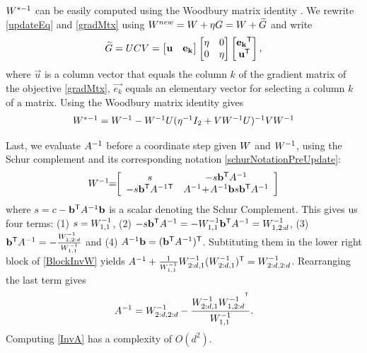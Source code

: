 \documentclass{article}
\begin{document}
${W}^{*-1}$ can be easily computed using the Woodbury matrix
identity \cite{woodbury1950inverting}. We rewrite  \eqref{updateEq} and \eqref{gradMtx} using ${{W^{new}}} = {W} + \eta G = {W}+{\widetilde{G}}$
and write
\begin{equation}
  {\widetilde{G}} = {U}{C}{V} = \left[ \begin{matrix}
      \mathbf{u} & \mathbf{e_k} \end{matrix} \right] \left[ \begin{matrix}
      \eta & 0 \\ 0 & \eta \end{matrix} \right] \left[ \begin{matrix}
      \mathbf{e_k}{}^\mathsf{T} \\ \mathbf{u}{}^\mathsf{T} \end{matrix} \right],
  \label{gradMtxWDB}
\end{equation}
where $\vec{u}$ is a column vector that equals the column $k$ of the gradient matrix of the objective \eqref{gradMtx},
$\vec{e_k}$ equals an elementary vector for selecting a column $k$ of
a matrix. 
Using the Woodbury matrix identity gives 
\begin{equation}
    \begin{array}{lcl}
    {W}^{*-1} = 
    {W}^{-1} - {W}^{-1} {U} (\eta^{-1} I_2 + {V}     {W}^{-1} {U})^{-1} {V} {W}^{-1}
    \end{array}
    \label{InvWwdb}
\end{equation}

Last, we evaluate $A^{-1}$ before a coordinate step given ${W}$
and ${W}^{-1}$, using the Schur complement and its corresponding
notation \eqref{schurNotationPreUpdate}:
\begin{equation}
\begin{array}{l}
 {W}^{-1} \!\!=\!\! 
 \left[ \begin{array}{cc} s & -s \mathbf{b}{}^\mathsf{T} A^{-1} \\ -s \mathbf{b}{}^\mathsf{T} A^{-1}{}^\mathsf{T} &  A^{-1} \!+ \!A^{-1} \mathbf{b} s \mathbf{b}{}^\mathsf{T} A^{-1}  \end{array}  \right]
\end{array}
\label{BlockInvW}
\end{equation}
where $s= c-\mathbf{b}{}^\mathsf{T} A^{-1} \mathbf{b}$ is a scalar denoting the Schur Complement. This gives us four terms: (1) $s = {W}^{-1}_{1,1}$, (2)
$  -s \mathbf{b}{}^\mathsf{T} A^{-1} = -{W}^{-1}_{1,1} \mathbf{b}{}^\mathsf{T} A^{-1} = {W}^{-1}_{1,2:d}$, (3) $\mathbf{b}{}^\mathsf{T} A^{-1} = -\frac{{W}^{-1}_{1,2:d}}{{W}^{-1}_{1,1} }$ and (4) $A^{-1}\mathbf{b} = (\mathbf{b}{}^\mathsf{T} A^{-1}){}^\mathsf{T}$. Subtituting them in the lower right block of \eqref{BlockInvW} yields $A^{-1} + \frac{1}{{W}^{-1}_{1,1} } {W}^{-1}_{2:d,1} ({W}^{-1}_{2:d,1}){}^\mathsf{T} = {W}^{-1}_{2:d,2:d}$. Rearranging the last term gives
\begin{equation}
  A^{-1} = {W}^{-1}_{2:d,2:d}- \frac{{W}^{-1}_{2:d,1} {{W}^{-1}_{1,2:d}}^{{}^\mathsf{T}}}{{W}^{-1}_{1,1}}. 
  \label{InvA}
\end{equation}
Computing \eqref{InvA} has a complexity of $O(d^2)$.
\end{document}
